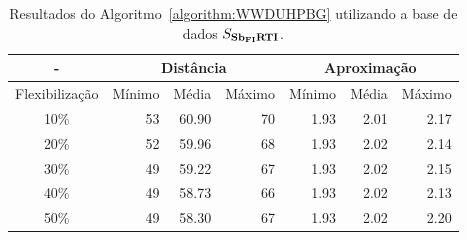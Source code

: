 \begin{table}[!htb]
  \caption{Resultados do Algoritmo~\ref{algorithm:WWDUHPBG} utilizando a base de dados $S_{\textbf{Sb\textsubscript{FI}RTI}}{}$.}
  \label{table:SMSSPGPF}
  \centering
  \begin{tabular}{|c|r|r|r|r|r|r|}
    \hline
      -            & \multicolumn{3}{c|}{Distância}             & \multicolumn{3}{c|}{Aproximação}           \\ \hline
    Flexibilização & Mínimo       & Média        & Máximo       & Mínimo       & Média        & Máximo       \\ \hline  
    10\%           & 53           & 60.90        & 70           & 1.93         & 2.01         & 2.17         \\ \hline
    20\%           & 52           & 59.96        & 68           & 1.93         & 2.02         & 2.14         \\ \hline
    30\%           & 49           & 59.22        & 67           & 1.93         & 2.02         & 2.15         \\ \hline
    40\%           & 49           & 58.73        & 66           & 1.93         & 2.02         & 2.13         \\ \hline
    50\%           & 49           & 58.30        & 67           & 1.93         & 2.02         & 2.20         \\ \hline    
  \end{tabular}
\end{table}